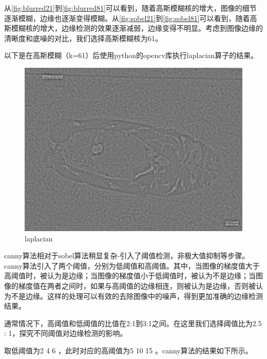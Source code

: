 从\autoref{fig:blurred21}到\autoref{fig:blurred81}可以看到，随着高斯模糊核的增大，图像的细节逐渐模糊，边缘也逐渐变得模糊。从\autoref{fig:sobel21}到\autoref{fig:sobel81}可以看到，随着高斯模糊核的增大，边缘检测的效果逐渐减弱，边缘变得不明显。考虑到图像边缘的清晰度和底噪的对比，我们选择高斯模糊核为61。


以下是在高斯模糊（k=61）后使用python的opencv库执行laplacian算子的结果。

\begin{figure}
    \centering
    \begin{minipage}{0.45\textwidth}
        \centering
        \includegraphics[width=\textwidth]{./fig/gausssian/laplacian61.jpg}
        \caption{laplacian}
        \label{fig:laplacian}
    \end{minipage}
\end{figure}

canny算法相对于sobel算法稍显复杂-引入了阈值检测，非极大值抑制等步骤。canny算法引入了两个阈值，分别为低阈值和高阈值。其中，当图像的梯度值大于高阈值时，被认为是边缘；当图像的梯度值小于低阈值时，被认为不是边缘；当图像的梯度值在两者之间时，如果与高阈值的边缘相连，则被认为是边缘，否则被认为不是边缘。这样的处理可以有效的去除图像中的噪声，得到更加准确的边缘检测结果。

通常情况下，高阈值和低阈值的比值在2:1到3:1之间。在这里我们选择阈值比为2.5 : 1，探究不同阈值对边缘检测的影响。

取低阈值为2 4 6 ，此时对应的高阈值为5 10 15 。canny算法的结果如下所示。

